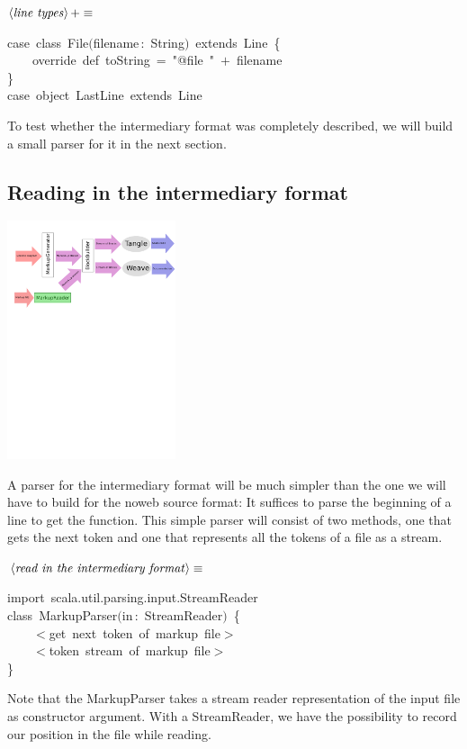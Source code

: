 \documentclass[a4paper,12pt]{article}
\begin{document}
\begin{description}
$\left<\mbox{\emph{line types}}\right>+\equiv$
\begin{program}{\vem case}~{\vem class}~File$($filename\,{\rm :}~String$)$~{\vem extends}~Line~{\small\{}
\\~~~~{\vem override}~{\vem def}~toString~=~"@file~"~$+$~filename
\\{\small\}}
\\{\vem case}~{\vem object}~LastLine~{\vem extends}~Line
\\[0.5em]\end{program}
\end{description}

To test whether the intermediary format was completely described, we
will build a small parser for it in the next section.

\subsection{Reading in the intermediary format}

\includegraphics[viewport=0 500 264 800,clip,height=7cm]{images/markupReader.pdf}

A parser for the intermediary format will be much simpler than the one
we will have to build for the noweb source format: It suffices to parse
the beginning of a line to get the function. This simple parser will
consist of two methods, one that gets the next token and one that
represents all the tokens of a file as a stream.

$\left<\mbox{\emph{read in the intermediary format}}\right>\equiv$
\begin{program}{\vem import}~scala.util.parsing.input.StreamReader
\\{\vem class}~MarkupParser$($in\,{\rm :}~StreamReader$)$~{\small\{}
\\~~~~$<$get~next~token~of~markup~file$>$
\\~~~~$<$token~stream~of~markup~file$>$
\\{\small\}}
\\[0.5em]\end{program}
Note that the MarkupParser takes a stream reader representation of
the input file as constructor argument. With a StreamReader, we have
the possibility to record our position in the file while reading.
\end{document}
